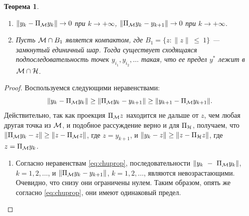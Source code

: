 \documentclass[12pt, specialist, subf,href,colorlinks=true,substylefile = spbu.rtx]{disser}
\newtheorem{theorem}{Теорема}
\theoremstyle{remark}
\theoremstyle{definition}
\begin{document}
\begin{theorem}
	\label{th:converg}
	\begin{enumerate}
		Пусть выпоняются условия Предложения~\ref{prop:pythaprop}, а также множество $\calM$ и подпространство $\calH$ топологически замкнуты. Тогда
		\item $\|y_k - \Pi_{\mathcal{M}}y_k\| \to 0$ при $k \to +\infty$, $\|\Pi_{\mathcal{M}}y_k - y_{k+1}\| \to 0$ при $k \to +\infty$.
		\item Пусть $\mathcal{M} \cap B_1$ является компактом, где $B_1=\{z: \|z\|~\le~1\}$ --- замкнутый единичный шар. Тогда существует сходящаяся подпоследовательность точек $y_{i_1}, y_{i_2}, \ldots$ такая, что ее предел $y^*$ лежит в $\mathcal{M} \cap \mathcal{H}$.
	\end{enumerate}
\end{theorem}
\begin{proof}
	Воспользуемся следующими неравенствами:
	\begin{equation}
	\label{eq:chuprop}
	\|y_k - \Pi_{\mathcal{M}} y_k\| \ge \|\Pi_{\mathcal{M}} y_k - y_{k + 1}\| \ge \|y_{k+1} - \Pi_{\mathcal{M}} y_{k + 1}\|.
	\end{equation}
	Действительно, так как проекция $\Pi_{\mathcal{M}} z$ находится не дальше от $z$, чем любая другая точка из $\calM$, и подобное рассуждение верно и для
	$\Pi_{\mathcal{H}}$, получаем, что $\|\Pi_{\mathcal{M}} y_k - z\| \ge \|z - \Pi_{\mathcal{M}} z\|$, где $z=y_{k+1}$, и $\|y_k - z\| \ge \|z - \Pi_{\mathcal{H}} z\|$, где $z=\Pi_{\mathcal{M}} y_k$.
	\begin{enumerate}
		\item Согласно неравенствам \eqref{eq:chuprop}, последовательности $\|y_k~-~\Pi_{\mathcal{M}} y_k\|$, $k = 1, 2, \ldots$, и $\|\Pi_{\mathcal{M}} y_k - y_{k + 1}\|$, $k = 1, 2, \ldots$, являются невозрастающими. Очевидно, что снизу они ограничены нулем. Таким образом, опять же согласно \eqref{eq:chuprop}, они имеют одинаковый предел.
		

\end{enumerate}
\end{proof}
\end{document}
